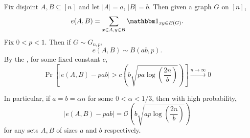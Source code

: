 \documentclass{article}
\begin{document}
			Fix disjoint $A, B \subseteq [n]$ and let $|A|=a$, $|B|=b$. Then given a graph $G$ on $[n]$,
			\[ e(A,B) = \sum_{x \in A, y \in B} \indic_{xy \in E(G)}. \]
			Fix $0<p<1$. Then if $G \sim G_{n,p}$,
			\[ e(A,B) \sim B\left( ab, p \right). \]
			By the , for some fixed constant $c$,
			\[ \Pr\left[ |e(A,B) - pab| > c \left(b\sqrt{pa\log\left(\frac{2n}{b}\right)}\right) \right] \xrightarrow{n\to\infty} 0 \]

			In particular, if $a = b = \alpha n$ for some $0 < \alpha < 1/3$, then with high probability,
			\[ |e(A,B) - pab| = \mathcal{O}\left(b\sqrt{ap\log\left(\frac{2n}{b}\right)}\right) \]
			for any sets $A, B$ of sizes $a$ and $b$ respectively.




\end{document}
